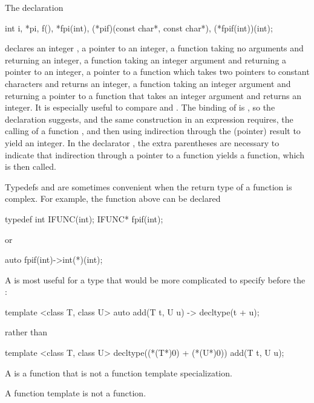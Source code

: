 \pnum
\begin{example}
The declaration
\begin{codeblock}
int i,
    *pi,
    f(),
    *fpi(int),
    (*pif)(const char*, const char*),
    (*fpif(int))(int);
\end{codeblock}
declares an integer
,
a pointer
to an integer,
a function
taking no arguments and returning an integer,
a function
taking an integer argument and returning a pointer to an integer,
a pointer
to a function which
takes two pointers to constant characters and returns an integer,
a function
taking an integer argument and returning a pointer to a function that takes an integer argument and returns an integer.
It is especially useful to compare
and
.
The binding of
is
,
so the declaration suggests,
and the same construction in an expression
requires, the calling of a function
,
and then using indirection through the (pointer) result
to yield an integer.
In the declarator
,
the extra parentheses are necessary to indicate that indirection through
a pointer to a function yields a function, which is then called.
\end{example}
\begin{note}
Typedefs and  are sometimes convenient when the return type of a function is complex.
For example,
the function
above can be declared
\begin{codeblock}
typedef int  IFUNC(int);
IFUNC*  fpif(int);
\end{codeblock}
or
\begin{codeblock}
auto fpif(int)->int(*)(int);
\end{codeblock}

A  is most useful for a type that would be more complicated to specify before the :
\begin{codeblock}
template <class T, class U> auto add(T t, U u) -> decltype(t + u);
\end{codeblock}
rather than
\begin{codeblock}
template <class T, class U> decltype((*(T*)0) + (*(U*)0)) add(T t, U u);
\end{codeblock}
\end{note}

\pnum
A  is a function that is not a function template
specialization.
\begin{note}
A function template is not a function.
\end{note}

